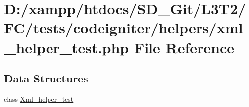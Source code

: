 \hypertarget{tests_2codeigniter_2helpers_2xml__helper__test_8php}{}\section{D\+:/xampp/htdocs/\+S\+D\+\_\+\+Git/\+L3\+T2/\+F\+C/tests/codeigniter/helpers/xml\+\_\+helper\+\_\+test.php File Reference}
\label{tests_2codeigniter_2helpers_2xml__helper__test_8php}
\subsection*{Data Structures}
\begin{DoxyCompactItemize}
\item 
class \hyperlink{class_xml__helper__test}{Xml\+\_\+helper\+\_\+test}
\end{DoxyCompactItemize}
